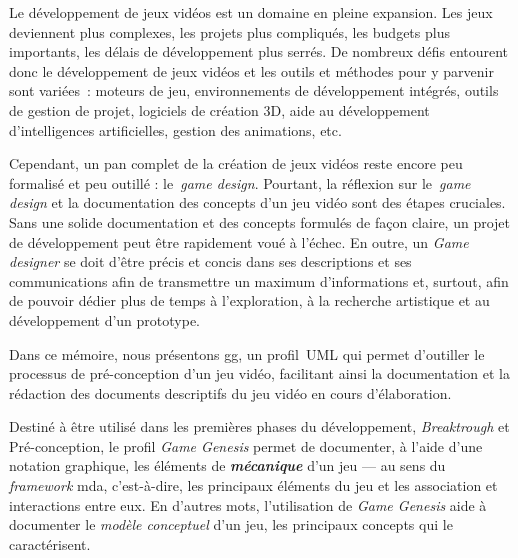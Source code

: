 \begin{introduction}



Le développement de jeux vidéos est un domaine en pleine expansion.
%
Les jeux deviennent plus complexes, les projets plus compliqués, les
budgets plus importants, les d\'elais de développement plus serr\'es.
%
De nombreux défis entourent donc le développement de jeux vidéos et
les outils et méthodes pour y parvenir sont variées~: moteurs de jeu,
environnements de développement intégrés, outils de gestion de projet,
logiciels de création 3D, aide au développement d'intelligences
artificielles, gestion des animations, etc.

Cependant, un pan complet de la création de jeux vidéos reste encore
peu formalisé et peu outillé : le~\emph{game design}.
%
Pourtant, la réflexion sur le~\emph{game design} et la documentation des concepts d'un jeu vidéo sont des étapes cruciales.
%
Sans une solide documentation et des concepts formul\'es de fa\c{c}on claire, un
projet de développement peut être rapidement voué à l'échec.
%
En outre, un \emph{Game designer} se doit d'être précis et concis dans ses
descriptions et ses communications afin de transmettre un maximum
d'informations et, surtout, afin de pouvoir dédier plus de temps à l'exploration, à
la recherche artistique et au développement d'un prototype.

Dans ce mémoire, nous présentons \gls{gg}, un profil~UML qui permet d'outiller le processus de pré-conception d'un jeu vidéo, facilitant ainsi la documentation et la rédaction des documents descriptifs du jeu vidéo en cours d'élaboration.

\begin{comment}
\gt{Ci-bas: il vaut mieux ne pas parler <<d'acc\'el\'eration>>, car tu
n'apportes aucune preuve/justification que cela permet d'aller plus
rapidement.}
\end{comment}


%
Destiné à être utilisé dans les premières phases du développement,
\emph{Breaktrough} et Pré-conception, le profil \emph{Game Genesis}
permet de documenter, à l'aide d'une notation graphique, les
\'el\'ements de \emph{\bf mécanique} d'un jeu --- au sens du
\emph{framework} \gls{mda}, c'est-\`a-dire,
les principaux éléments du jeu et les association et interactions
entre eux.
%
En d'autres mots, l'utilisation de \emph{Game Genesis} aide \`a
documenter le \emph{mod\`ele conceptuel} d'un jeu, les principaux
concepts qui le caract\'erisent.



\end{introduction}
